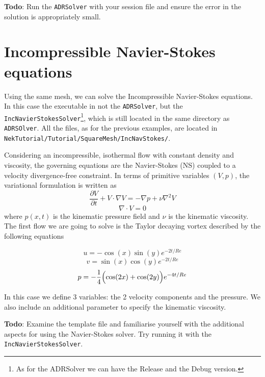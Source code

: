 \documentclass[a4paper,12pt]{article}
\begin{document}
\textbf{Todo}: Run the \texttt{ADRSolver} with your session file and ensure the
error in the solution is appropriately small.


\clearpage
\section{Incompressible Navier-Stokes equations}

Using the same mesh, we can solve the Incompressible Navier-Stokes
equations. In this case the executable in not the \texttt{ADRSolver},
but the \texttt{IncNavierStokesSolver}\footnote{As for the ADRSolver we can have the
Release and the Debug version.}, which is still located in the same
directory as \texttt{ADRSOlver}. All the files, as for the previous examples,
are located in\\ \texttt{NekTutorial/Tutorial/SquareMesh/IncNavStokes/}.

Considering an incompressible, isothermal flow with constant density
and viscosity, the governing equations are the Navier-Stokes (NS) coupled to a
velocity divergence-free constraint. In terms of primitive variables $(V,p)$,
the variational formulation is written as
\begin{equation}
\frac{\partial V}{\partial t} + V \cdot  \nabla V = -\nabla p + \nu \nabla^2 V
\label{eq:NS1}
\end{equation}
\begin{equation}
\nabla \cdot V = 0
\label{eq:NSequation}
\end{equation}
where $p(x,t)$ is the kinematic pressure field and $\nu$ is the kinematic
viscosity. The first flow we are going to solve is the Taylor decaying vortex
described by the following equations

\begin{equation}
u=-\cos(x)\sin(y)e^{-2t/Re}
\label{eq:Dec1}
\end{equation}
\begin{equation}
v=\sin(x)\cos(y)e^{-2t/Re}
\label{eq:Dec2}
\end{equation}
\begin{equation}
p=-\frac{1}{4}\Bigl(\cos(2x)+\cos(2y)\Bigr)e^{-4t/Re}
\label{eq:Dec3}
\end{equation}

In this case we define 3 variables: the 2 velocity components and the pressure.
We also include an additional parameter to specify the kinematic viscosity.

\textbf{Todo}: Examine the template file and familiarise yourself with the
additional aspects for using the Navier-Stokes solver. Try running it with the
\texttt{IncNavierStokesSolver}.
\end{document}
